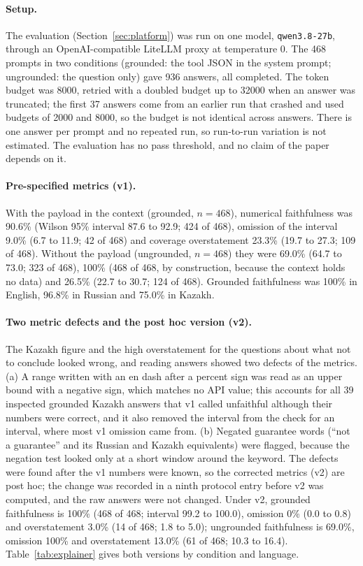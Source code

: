 \paragraph{Setup.} The evaluation (Section~\ref{sec:platform}) was run on one model, \texttt{qwen3.8-27b}, through an OpenAI-compatible LiteLLM proxy at temperature 0. The 468 prompts in two conditions (grounded: the tool JSON in the system prompt; ungrounded: the question only) gave 936 answers, all completed. The token budget was 8000, retried with a doubled budget up to 32000 when an answer was truncated; the first 37 answers come from an earlier run that crashed and used budgets of 2000 and 8000, so the budget is not identical across answers. There is one answer per prompt and no repeated run, so run-to-run variation is not estimated. The evaluation has no pass threshold, and no claim of the paper depends on it.

\paragraph{Pre-specified metrics (v1).} With the payload in the context (grounded, $n=468$), numerical faithfulness was 90.6\% (Wilson 95\% interval 87.6 to 92.9; 424 of 468), omission of the interval 9.0\% (6.7 to 11.9; 42 of 468) and coverage overstatement 23.3\% (19.7 to 27.3; 109 of 468). Without the payload (ungrounded, $n=468$) they were 69.0\% (64.7 to 73.0; 323 of 468), 100\% (468 of 468, by construction, because the context holds no data) and 26.5\% (22.7 to 30.7; 124 of 468). Grounded faithfulness was 100\% in English, 96.8\% in Russian and 75.0\% in Kazakh.

\paragraph{Two metric defects and the post hoc version (v2).} The Kazakh figure and the high overstatement for the questions about what not to conclude looked wrong, and reading answers showed two defects of the metrics. (a) A range written with an en dash after a percent sign was read as an upper bound with a negative sign, which matches no API value; this accounts for all 39 inspected grounded Kazakh answers that v1 called unfaithful although their numbers were correct, and it also removed the interval from the check for an interval, where most v1 omission came from. (b) Negated guarantee words (``not a guarantee'' and its Russian and Kazakh equivalents) were flagged, because the negation test looked only at a short window around the keyword. The defects were found after the v1 numbers were known, so the corrected metrics (v2) are post hoc; the change was recorded in a ninth protocol entry before v2 was computed, and the raw answers were not changed. Under v2, grounded faithfulness is 100\% (468 of 468; interval 99.2 to 100.0), omission 0\% (0.0 to 0.8) and overstatement 3.0\% (14 of 468; 1.8 to 5.0); ungrounded faithfulness is 69.0\%, omission 100\% and overstatement 13.0\% (61 of 468; 10.3 to 16.4). Table~\ref{tab:explainer} gives both versions by condition and language.

